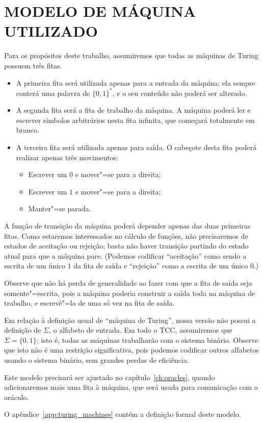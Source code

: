 \section{MODELO DE MÁQUINA UTILIZADO}

Para os propósitos deste trabalho,
assumiremos que todas as máquinas de Turing possuem três fitas.
\begin{itemize}
    \item A primeira fita será utilizada apenas para a entrada da máquina;
        ela sempre conterá uma palavra de $\{0, 1\}^*$,
        e o seu conteúdo não poderá ser alterado.
    \item A segunda fita será a fita de trabalho da máquina.
        A máquina poderá ler e escrever símbolos arbitrários nesta fita infinita,
        que começará totalmente em branco.
    \item A terceira fita será utilizada apenas para saída.
        O cabeçote desta fita poderá realizar apenas três movimentos:
        \begin{itemize}
            \item Escrever um $0$ e mover"=se para a direita;
            \item Escrever um $1$ e mover"=se para a direita;
            \item Manter"=se parada.
        \end{itemize}
\end{itemize}

A função de transição da máquina poderá depender apenas das duas primeiras fitas.
Como estaremos interessados no cálculo de funções,
não precisaremos de estados de aceitação ou rejeição;
basta não haver transição partindo do estado atual para que a máquina pare.
(Podemos codificar ``aceitação'' como sendo a escrita de um único $1$ da fita de saída
e ``rejeição'' como a escrita de um único $0$.)

Observe que não há perda de generalidade
ao fazer com que a fita de saída seja somente"=escrita,
pois a máquina poderia construir a saída toda na máquina de trabalho,
e escrevê"=la de uma só vez na fita de saída.

Em relação à definição usual de ``máquina de Turing'',
nossa versão não possui a definição de $\Sigma$,
o alfabeto de entrada.
Em todo o TCC,
assumiremos que $\Sigma = \{0, 1\}$;
isto é, todas as máquinas trabalharão com o sistema binário.
Observe que isto não é uma restrição significativa,
pois podemos codificar outros alfabetos usando o sistema binário,
sem grandes perdas de eficiência.

Este modelo precisará ser ajustado no capítulo~\ref{ch:oracles},
quando adicionaremos mais uma fita à máquina,
que será usada para comunicação com o oráculo.

O apêndice~\ref{app:turing_machines}
contém a definição formal deste modelo.
